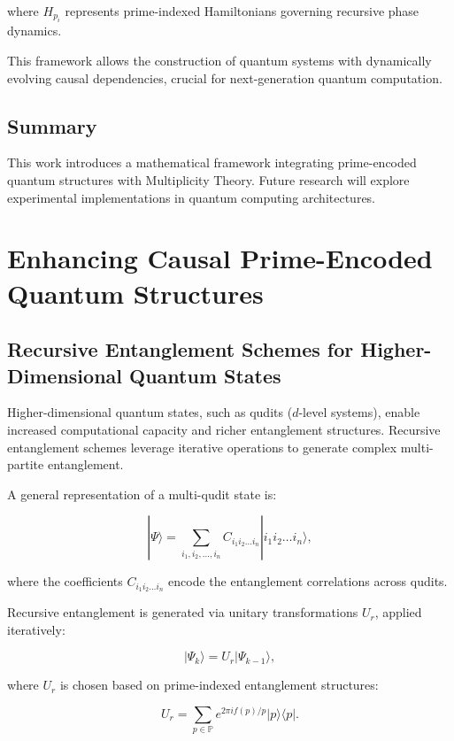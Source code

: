 \documentclass{article}
\theoremstyle{plain}
\begin{document}
where \( H_{p_i} \) represents prime-indexed Hamiltonians governing recursive phase dynamics.

This framework allows the construction of quantum systems with dynamically evolving causal dependencies, crucial for next-generation quantum computation.


\subsection{Summary}
This work introduces a mathematical framework integrating prime-encoded quantum structures with Multiplicity Theory. Future research will explore experimental implementations in quantum computing architectures.

\section{Enhancing Causal Prime-Encoded Quantum Structures}

\subsection{Recursive Entanglement Schemes for Higher-Dimensional Quantum States}

Higher-dimensional quantum states, such as qudits (\( d \)-level systems), enable increased computational capacity and richer entanglement structures. Recursive entanglement schemes leverage iterative operations to generate complex multi-partite entanglement.

A general representation of a multi-qudit state is:

\begin{equation}
|\Psi\rangle = \sum_{i_1, i_2, \dots, i_n} C_{i_1 i_2 \dots i_n} |i_1 i_2 \dots i_n\rangle,
\end{equation}

where the coefficients \( C_{i_1 i_2 \dots i_n} \) encode the entanglement correlations across qudits.

Recursive entanglement is generated via unitary transformations \( U_r \), applied iteratively:

\begin{equation}
|\Psi_k\rangle = U_r |\Psi_{k-1}\rangle,
\end{equation}

where \( U_r \) is chosen based on prime-indexed entanglement structures:

\begin{equation}
U_r = \sum_{p \in \mathbb{P}} e^{2\pi i f(p) / p} |p\rangle \langle p|.
\end{equation}
\end{document}
